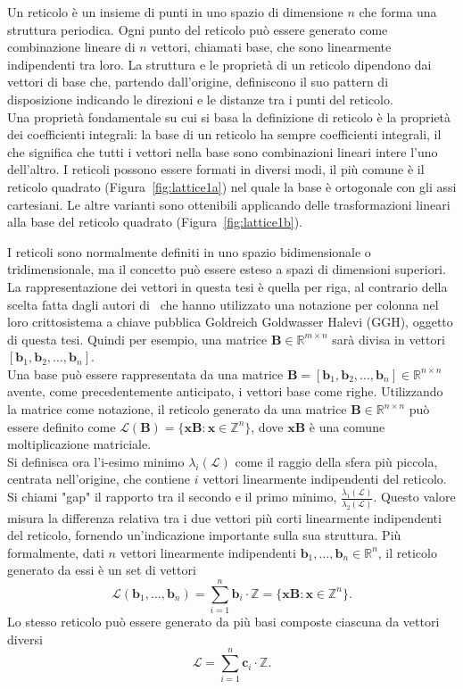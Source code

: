 Un reticolo è un insieme di punti in uno spazio di dimensione $n$ che forma una struttura 
periodica. Ogni punto del reticolo può essere generato come combinazione lineare di 
$n$ vettori, chiamati base, che sono linearmente indipendenti tra loro.
La struttura e le proprietà di un reticolo dipendono dai vettori di base che, 
partendo dall'origine, definiscono il suo pattern di disposizione indicando le direzioni 
e le distanze tra i punti del reticolo. \\
Una proprietà fondamentale su cui si basa la definizione di reticolo è la proprietà dei 
coefficienti integrali: la base di un reticolo ha sempre coefficienti integrali, 
il che significa che tutti i vettori nella base sono combinazioni lineari intere 
l'uno dell'altro.
I reticoli possono essere formati in diversi modi, il più comune è il reticolo quadrato 
(Figura~\ref{fig:lattice1a}) nel quale la base è ortogonale con gli assi cartesiani. 
Le altre varianti sono ottenibili applicando delle trasformazioni lineari alla base del 
reticolo quadrato (Figura~\ref{fig:lattice1b}).


I reticoli sono normalmente definiti in uno spazio bidimensionale o tridimensionale, 
ma il concetto può essere esteso a spazi di dimensioni superiori. La rappresentazione dei vettori in questa tesi è quella per riga, 
al contrario della scelta fatta dagli autori di~\cite{GGH97} che hanno utilizzato una notazione per
colonna nel loro crittosistema a chiave pubblica Goldreich Goldwasser Halevi (GGH), oggetto di questa tesi. Quindi per esempio, una matrice 
$\mathbf{B} \in \mathbb{R}^{m\times n}$ sarà divisa in vettori 
$[\mathbf{b}_1, \mathbf{b}_2, \dots, \mathbf{b}_n]$. 
\\
Una base può essere rappresentata da una matrice  
$\mathbf{B} = [\mathbf{b}_1,\mathbf{b}_2,\dots,\mathbf{b}_n] \in \mathbb{R}^{n \times n}$ 
avente, come precedentemente anticipato, i vettori base come righe.  Utilizzando la matrice come notazione, 
il reticolo generato da una matrice 
$\mathbf{B} \in \mathbb{R}^{n \times n}$ 
può essere definito come 
${\mathcal{L}(\mathbf{B}) = \bigl\{ \mathbf{x}\mathbf{B} : \mathbf{x} \in \mathbb{Z}^n \bigr\}}$, 
dove $\mathbf{x} \mathbf{B}$ 
è una comune moltiplicazione matriciale. \\
Si definisca ora l'i-esimo minimo $\lambda_i(\mathcal{L})$ come il raggio della sfera più 
piccola, centrata nell'origine, che contiene $i$ vettori linearmente indipendenti del reticolo. 
Si chiami "gap" il rapporto tra il secondo e il primo minimo, 
$\frac{\lambda_1(\mathcal{L})}{\lambda_2(\mathcal{L})}$. 
Questo valore misura la differenza relativa tra i due vettori più corti linearmente 
indipendenti del reticolo, fornendo un'indicazione importante sulla sua struttura.
Più formalmente, dati $n$ vettori linearmente indipendenti 
$\mathbf{b}_1,\dots, \mathbf{b}_n \in \mathbb{R}^n$,
il reticolo generato da essi è un set di vettori 
\[
\mathcal{L} (\mathbf{b}_1,\dots,\mathbf{b}_n) = \sum_{i=1}^{n}\mathbf{b}_i \cdot 
\mathbb{Z} = \bigl\{ {\mathbf{x} \mathbf{B} : \mathbf{x} \in \mathbb{Z}^n} \bigr\}.
\]
Lo stesso reticolo può essere generato da più basi composte ciascuna da vettori diversi
\[
    \mathcal{L} = \sum_{i=1}^{n}\mathbf{c}_i \cdot \mathbb{Z} .
\]


